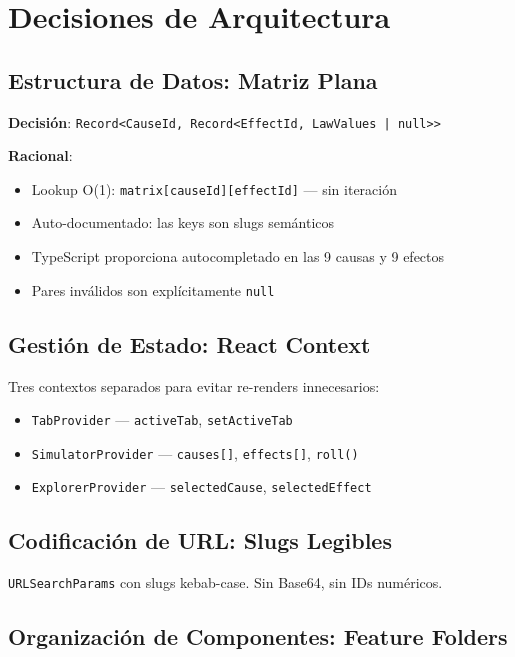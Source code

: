 \documentclass[11pt,a4paper]{report}
\begin{document}
\section{Decisiones de Arquitectura}

\subsection{Estructura de Datos: Matriz Plana}

\textbf{Decisión}: \texttt{Record<CauseId, Record<EffectId, LawValues | null>>}

\textbf{Racional}:
\begin{itemize}
  \item Lookup O(1): \texttt{matrix[causeId][effectId]} — sin iteración
  \item Auto-documentado: las keys son slugs semánticos
  \item TypeScript proporciona autocompletado en las 9 causas y 9 efectos
  \item Pares inválidos son explícitamente \texttt{null}
\end{itemize}

\subsection{Gestión de Estado: React Context}

Tres contextos separados para evitar re-renders innecesarios:
\begin{itemize}
  \item \texttt{TabProvider} — \texttt{activeTab}, \texttt{setActiveTab}
  \item \texttt{SimulatorProvider} — \texttt{causes[]}, \texttt{effects[]}, \texttt{roll()}
  \item \texttt{ExplorerProvider} — \texttt{selectedCause}, \texttt{selectedEffect}
\end{itemize}

\subsection{Codificación de URL: Slugs Legibles}

\texttt{URLSearchParams} con slugs kebab-case. Sin Base64, sin IDs numéricos.

\subsection{Organización de Componentes: Feature Folders}
\end{document}
